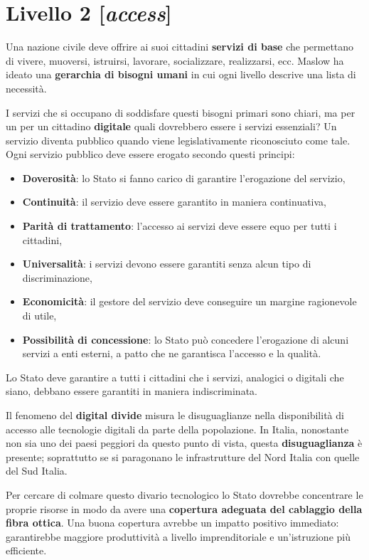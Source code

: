 \chapter{Livello 2 [\emph{access}]}
Una nazione civile deve offrire ai suoi cittadini \textbf{servizi di base} che permettano di vivere, muoversi, istruirsi, lavorare, socializzare, realizzarsi, ecc. Maslow ha ideato una \textbf{gerarchia di bisogni umani} in cui ogni livello descrive una lista di necessità. 

I servizi che si occupano di soddisfare questi bisogni primari sono chiari, ma per un per un cittadino \textbf{digitale} quali dovrebbero essere i servizi essenziali?
\bigbreak
Un servizio diventa pubblico quando viene legislativamente riconosciuto come tale. Ogni servizio pubblico deve essere erogato secondo questi principi:
\begin{itemize}
    \item \textbf{Doverosità}: lo Stato si fanno carico di garantire l’erogazione del servizio,
    \item \textbf{Continuità}: il servizio deve essere garantito in maniera continuativa,
    \item \textbf{Parità di trattamento}: l’accesso ai servizi deve essere  equo per tutti i cittadini,
    \item \textbf{Universalità}: i servizi devono essere garantiti senza alcun tipo di discriminazione,
    \item \textbf{Economicità}: il gestore del servizio deve conseguire un margine ragionevole di utile,
    \item \textbf{Possibilità di concessione}: lo Stato può concedere l’erogazione di alcuni servizi a enti esterni, a patto che ne garantisca l'accesso e la qualità.
\end{itemize}

\bigbreak
Lo Stato deve garantire a tutti i cittadini che i servizi, analogici o digitali che siano, debbano essere garantiti in maniera indiscriminata. 

Il fenomeno del \textbf{digital divide} misura le disuguaglianze nella disponibilità di accesso alle tecnologie digitali da parte della popolazione. In Italia, nonostante non sia uno dei paesi peggiori da questo punto di vista, questa \textbf{disuguaglianza} è presente; soprattutto se si paragonano le infrastrutture del Nord Italia con quelle del Sud Italia.

\bigbreak
Per cercare di colmare questo divario tecnologico lo Stato dovrebbe concentrare le proprie risorse in modo da avere una \textbf{copertura adeguata del cablaggio della fibra ottica}. Una buona copertura avrebbe un impatto positivo immediato: garantirebbe maggiore produttività a livello imprenditoriale e un’istruzione più efficiente.

